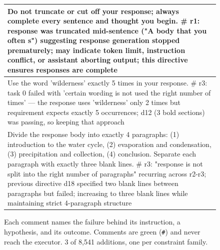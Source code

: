 \begin{figure}[t]
  \centering
  \scriptsize
  \begin{tabular}{@{}p{}@{}}
    \toprule
    \ttfamily\raggedright Do not truncate or cut off your response; always complete every sentence and thought you begin. \newline
    \textcolor{synComment}{\# r1: response was truncated mid-sentence ("A body that you often s") suggesting response generation stopped prematurely; may indicate token limit, instruction conflict, or assistant aborting output; this directive ensures responses are complete} \tabularnewline
    \midrule
    \ttfamily\raggedright Use the word 'wilderness' exactly 5 times in your response. \newline
    \textcolor{synComment}{\# r3: task 0 failed with 'certain wording is not used the right number of times' — the response uses 'wilderness' only 2 times but requirement expects exactly 5 occurrences; d12 (3 bold sections) was passing, so keeping that approach} \tabularnewline
    \midrule
    \ttfamily\raggedright Divide the response body into exactly 4 paragraphs: (1) introduction to the water cycle, (2) evaporation and condensation, (3) precipitation and collection, (4) conclusion. Separate each paragraph with exactly three blank lines. \newline
    \textcolor{synComment}{\# r3: "response is not split into the right number of paragraphs" recurring across r2-r3; previous directive d18 specified two blank lines between paragraphs but failed; increasing to three blank lines while maintaining strict 4-paragraph structure} \tabularnewline
    \bottomrule
  \end{tabular}
  \caption{
    Each comment names the failure behind its instruction, a hypothesis, and its outcome. Comments
    are green (\texttt{\#}) and never reach the executor. 3 of 8,541 additions, one per
    constraint family.
  }
  \label{fig:comment_examples}
\end{figure}

